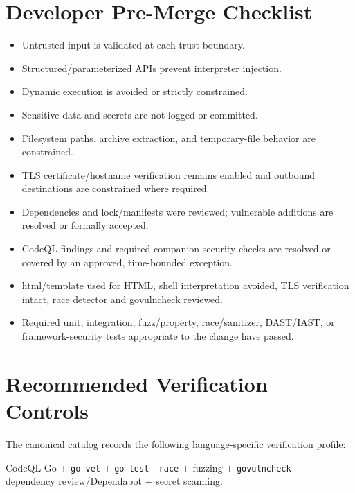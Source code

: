 \documentclass[10pt,letterpaper]{article}
\newcommand{\code}[1]{\texttt{\small #1}}
\begin{document}
\section{Developer Pre-Merge Checklist}
\begin{itemize}[leftmargin=*,itemsep=2pt]
\item Untrusted input is validated at each trust boundary.
\item Structured/parameterized APIs prevent interpreter injection.
\item Dynamic execution is avoided or strictly constrained.
\item Sensitive data and secrets are not logged or committed.
\item Filesystem paths, archive extraction, and temporary-file behavior are constrained.
\item TLS certificate/hostname verification remains enabled and outbound destinations are constrained where required.
\item Dependencies and lock/manifests were reviewed; vulnerable additions are resolved or formally accepted.
\item CodeQL findings and required companion security checks are resolved or covered by an approved, time-bounded exception.
\item html/template used for HTML, shell interpretation avoided, TLS verification intact, race detector and govulncheck reviewed.
\item Required unit, integration, fuzz/property, race/sanitizer, DAST/IAST, or framework-security tests appropriate to the change have passed.
\end{itemize}

\section{Recommended Verification Controls}
The canonical catalog records the following language-specific verification profile:

CodeQL Go + \code{go vet} + \code{go test -race} + fuzzing + \code{govulncheck} + dependency review/Dependabot + secret scanning.
\end{document}
